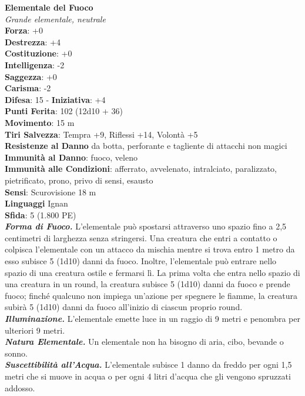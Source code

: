 \begin{multicols}{2}
\medskip\textbf{Elementale del Fuoco}\\
\emph{Grande elementale, neutrale}\\
\textbf{Forza}: +0\\
\textbf{Destrezza}: +4\\
\textbf{Costituzione}: +0\\
\textbf{Intelligenza}: -2\\
\textbf{Saggezza}: +0\\
\textbf{Carisma}: -2\\
\textbf{Difesa}: 15 - \textbf{Iniziativa}: +4\\
\textbf{Punti Ferita}: 102 (12d10 + 36)\\
\textbf{Movimento}: 15 m\\
\textbf{Tiri Salvezza}: Tempra +9, Riflessi +14, Volontà +5\\
\textbf{Resistenze al Danno} da botta, perforante e tagliente di attacchi non magici\\
\textbf{Immunità al Danno}: fuoco, veleno\\
\textbf{Immunità alle Condizioni}: afferrato, avvelenato, intralciato, paralizzato, pietrificato, prono, privo di sensi, esausto \\
\textbf{Sensi}: Scurovisione 18 m\\
\textbf{Linguaggi} Ignan\\
\textbf{Sfida}: 5 (1.800 PE)\smallskip\\
\emph{\textbf{Forma di Fuoco.}} L'elementale può spostarsi attraverso uno spazio fino a 2,5 centimetri di larghezza senza stringersi. Una creatura che entri a contatto o colpisca l'elementale con un attacco da mischia mentre si trova entro 1 metro da esso subisce 5 (1d10) danni da fuoco. Inoltre, l'elementale può entrare nello spazio di una creatura ostile e fermarsi lì. La prima volta che entra nello spazio di una creatura in un round, la creatura subisce 5 (1d10) danni da fuoco e prende fuoco; finché qualcuno non impiega un'azione per spegnere le fiamme, la creatura subirà 5 (1d10) danni da fuoco all'inizio di ciascun proprio round.\\
\emph{\textbf{Illuminazione.}} L'elementale emette luce in un raggio di 9 metri e penombra per ulteriori 9 metri.\\
\emph{\textbf{Natura Elementale.}} Un elementale non ha bisogno di aria, cibo, bevande o sonno.\\
\emph{\textbf{Suscettibilità all'Acqua.}} L'elementale subisce 1 danno da freddo per ogni 1,5 metri che si muove in acqua o per ogni 4 litri d'acqua che gli vengono spruzzati addosso.\\

\end{multicols}
